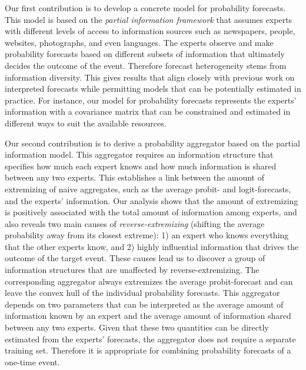 \documentclass[11pt]{article}
\theoremstyle{definition}
\theoremstyle{definition}
\begin{document}

Our first contribution is to develop a concrete model for probability forecasts. This model is based on the \textit{partial information framework} that assumes experts with different levels of access to information sources such as newspapers, people, websites, photographs, and even languages. The experts  observe and make probability forecasts based on different subsets of information that ultimately decides the outcome of the event. Therefore forecast heterogeneity stems from information diversity. This gives results that align closely with previous work on interpreted forecasts while permitting models that can be potentially estimated in practice. For instance, our model for probability forecasts represents  the experts' information with a covariance matrix that can be constrained and estimated in different ways to suit the available resources. 

Our second contribution is to derive a probability aggregator based on the partial information model. This aggregator requires an information structure that specifies how much each expert knows and how much information is shared between any two experts.  
This establishes a link between the amount of extremizing of naive aggregates, such as the average probit- and logit-forecasts, and the experts' information. Our analysis shows that the amount of extremizing is positively associated with the total amount of information among experts, and also reveals two main causes of \textit{reverse-extremizing} (shifting the average probability away from its closest extreme): 1) an expert who knows everything that the other experts know, and 2) highly influential information that drives the outcome of the target event. These causes lead us to discover a group of information structures that are unaffected by reverse-extremizing. The corresponding aggregator always extremizes the average probit-forecast and can leave the convex hull of the individual probability forecasts. This aggregator depends on two parameters that can be interpreted as the average amount of information known by an expert and the average amount of information shared between any two experts. Given that these two quantities can be directly estimated from the experts' forecasts, the aggregator does not require a separate training set. Therefore it is appropriate  for combining probability forecasts of a one-time event. 
\end{document}
